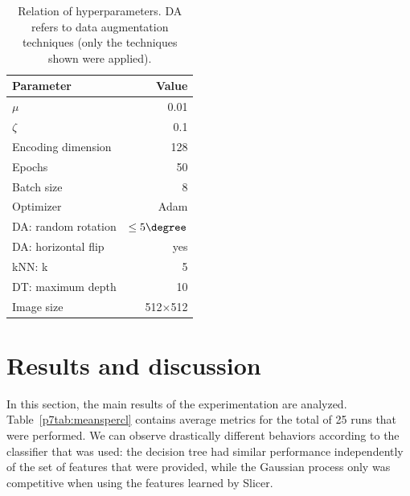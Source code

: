 \begin{table}[htbp]
    \centering
    \begin{tabular}{lr}
    \toprule
         \bfseries Parameter&\bfseries Value  \\\midrule
         \(\mu\)& 0.01\\
         \(\zeta\)&0.1\\
         Encoding dimension&128\\
         Epochs&50\\
         Batch size&8\\
         Optimizer&Adam\\
         DA: random rotation&$\leq5\degree$\\
         DA: horizontal flip&yes\\
         kNN: k&5\\
         DT: maximum depth&10\\
         Image size&512\(\times\)512\\
    \bottomrule
    \end{tabular}
    \caption{Relation of hyperparameters. DA refers to data augmentation techniques (only the techniques shown were applied).}
    \label{p7tab:params}
\end{table}

\section{Results and discussion}\label{p7sec.res}

In this section, the main results of the experimentation are analyzed. Table~\ref{p7tab:meanspercl} contains average metrics for the total of 25 runs that were performed. We can observe drastically different behaviors according to the classifier that was used: the decision tree had similar performance independently of the set of features that were provided, while the Gaussian process only was competitive when using the features learned by Slicer.

